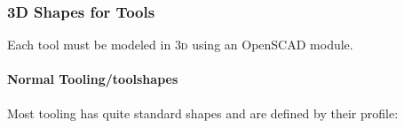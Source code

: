 \documentclass{ltxdoc}
\begin{document}
\subsubsection{3D Shapes for Tools}

Each tool must be modeled in \textsc{3d} using an OpenSCAD module. 

\begin{samepage}
\paragraph{Normal Tooling/toolshapes}

\label{para:normaltooling} Most tooling has quite standard shapes 
and are defined by their profile:


\end{samepage}
\end{document}
